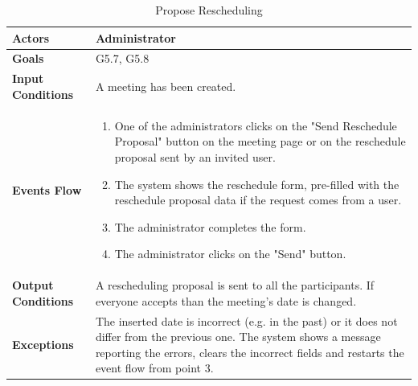 \begin{table}[H]
	\centering
	\def\arraystretch{1.5}
	\begin{tabular}{|p{7cm}|p{7cm}|}
		\hline
		\textbf{Actors}           & Administrator    \\ \hline
		\textbf{Goals}            & G5.7, G5.8           \\ \hline
		{\textbf{Input Conditions}}  & A meeting has been created.           \\ \hline
		{\textbf{Events Flow}}       &
		\begin{enumerate}[topsep=0pt, leftmargin=*]					
			\item One of the administrators clicks on the "Send Reschedule Proposal" button on the meeting page or on the reschedule proposal sent by an invited user.
			\item The system shows the reschedule form, pre-filled with the reschedule proposal data if the request comes from a user.
			\item The administrator completes the form.
			\item The administrator clicks on the "Send" button.
		\end{enumerate}                         \\ \hline
		\textbf{Output Conditions} & A rescheduling proposal is sent to all the participants. If everyone accepts than the meeting's date is changed.         \\ \hline
		\textbf{Exceptions}        & The inserted date is incorrect (e.g. in the past) or it does not differ from the previous one. The system shows a message reporting the errors, clears the incorrect fields and restarts the event flow from point 3.  \\ \hline
	\end{tabular}
	\caption{Propose Rescheduling}
\end{table}